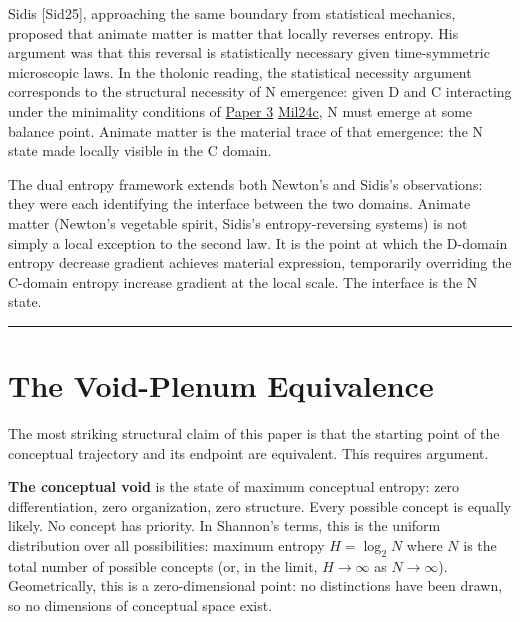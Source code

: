 \documentclass[12pt]{article}
\begin{document}
Sidis {[}Sid25{]}, approaching the same boundary from statistical
mechanics, proposed that animate matter is matter that locally reverses
entropy. His argument was that this reversal is statistically necessary
given time-symmetric microscopic laws. In the tholonic reading, the
statistical necessity argument corresponds to the structural necessity
of N emergence: given D and C interacting under the minimality
conditions of
\href{https://github.com/baardev/truevalue/blob/main/docnav/Research/papers/3_minimal-recursive-triadic-framework/3_minimal-recursive-triadic-framework.pdf}{Paper
3}
\href{https://github.com/baardev/truevalue/blob/main/docnav/Research/papers/3_minimal-recursive-triadic-framework/3_minimal-recursive-triadic-framework.pdf}{Mil24c},
N must emerge at some balance point. Animate matter is the material
trace of that emergence: the N state made locally visible in the C
domain.

The dual entropy framework extends both Newton's and Sidis's
observations: they were each identifying the interface between the two
domains. Animate matter (Newton's vegetable spirit, Sidis's
entropy-reversing systems) is not simply a local exception to the second
law. It is the point at which the D-domain entropy decrease gradient
achieves material expression, temporarily overriding the C-domain
entropy increase gradient at the local scale. The interface is the N
state.

\begin{center}\rule{0.5\linewidth}{0.5pt}\end{center}

\section{The Void-Plenum Equivalence}\label{the-void-plenum-equivalence}

The most striking structural claim of this paper is that the starting
point of the conceptual trajectory and its endpoint are equivalent. This
requires argument.

\textbf{The conceptual void} is the state of maximum conceptual entropy:
zero differentiation, zero organization, zero structure. Every possible
concept is equally likely. No concept has priority. In Shannon's terms,
this is the uniform distribution over all possibilities: maximum entropy
\(H = \log_2 N\) where \(N\) is the total number of possible concepts
(or, in the limit, \(H \to \infty\) as \(N \to \infty\)). Geometrically,
this is a zero-dimensional point: no distinctions have been drawn, so no
dimensions of conceptual space exist.
\end{document}
